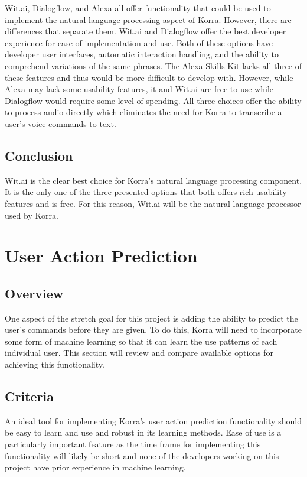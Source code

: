\documentclass[onecolumn, draftclsnofoot,10pt, compsoc]{IEEEtran}
\def \botname{Korra\xspace}
\begin{document}
        \noindent Wit.ai, Dialogflow, and Alexa all offer functionality that could be used to implement the natural language processing aspect of \botname. 
        However, there are differences that separate them. 
        Wit.ai and Dialogflow offer the best developer experience for ease of implementation and use. 
        Both of these options have developer user interfaces, automatic interaction handling, and the ability to comprehend variations of the same phrases. 
        The Alexa Skills Kit lacks all three of these features and thus would be more difficult to develop with. 
        However, while Alexa may lack some usability features, it and Wit.ai are free to use while Dialogflow would require some level of spending. 
        All three choices offer the ability to process audio directly which eliminates the need for \botname to transcribe a user's voice commands to text.
    
    \subsection{Conclusion}
        Wit.ai is the clear best choice for \botname's natural language processing component. 
        It is the only one of the three presented options that both offers rich usability features and is free. 
        For this reason, Wit.ai will be the natural language processor used by \botname. 

\section{User Action Prediction}
    \subsection{Overview}
        One aspect of the stretch goal for this project is adding the ability to predict the user's commands before they are given. 
        To do this, \botname will need to incorporate some form of machine learning so that it can learn the use patterns of each individual user.
        This section will review and compare available options for achieving this functionality.
    \subsection{Criteria}
        An ideal tool for implementing \botname's user action prediction functionality should be easy to learn and use and robust in its learning methods. 
        Ease of use is a particularly important feature as the time frame for implementing this functionality will likely be short and none of the developers working on this project have prior experience in machine learning.
\end{document}
